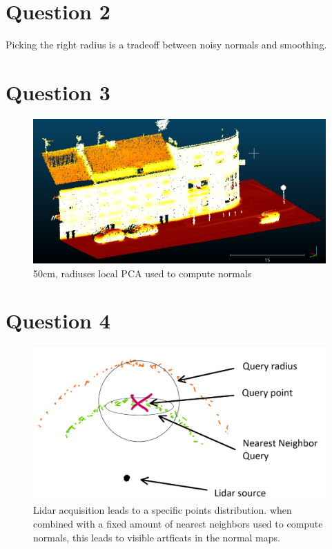 \documentclass[a4paper]{article}
\begin{document}
\section*{Question 2}
Picking the right radius is a tradeoff between noisy normals and smoothing.


\section*{Question 3}
\begin{figure}[ht]
  \centering
  \includegraphics[width=.9\linewidth]{figures/cc_normals_PCA_50cm_bigger_points.png}
  \caption{50cm, radiuses local PCA used to compute normals}
  \label{fig:local_pca}
\end{figure}


\section*{Question 4}
\begin{figure}[ht]
  \centering
  \includegraphics[width=.9\linewidth]{figures/Schema.png}
  \caption{Lidar acquisition leads to a specific points distribution. when combined with a fixed amount
  of nearest neighbors used to compute normals, this leads to visible artficats in the normal maps.
  } 
  \label{fig:lidar}
\end{figure}
\end{document}

